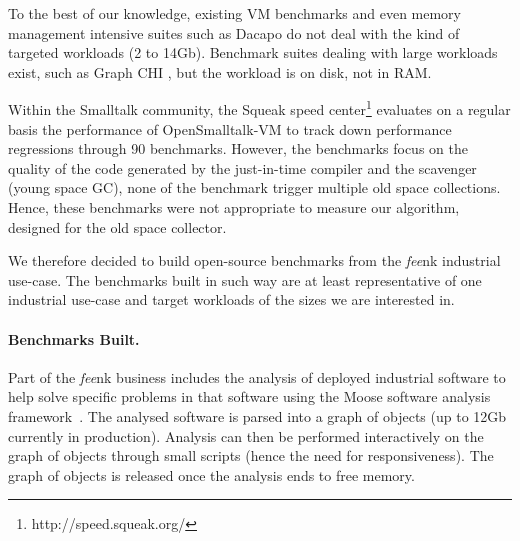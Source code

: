 \documentclass[sigplan,10pt,review,anonymous]{acmart}\settopmatter{printfolios=true,printccs=false,printacmref=false}
\def\feenk{\textit{fee}\textsf{nk}\xspace}
\def\OpenSmalltalkVM{OpenSmalltalk-VM\xspace}
\begin{document}
To the best of our knowledge, existing VM benchmarks and even memory management intensive suites such as Dacapo \cite{DacapoBench} do not deal with the kind of targeted workloads (2 to 14Gb). Benchmark suites dealing with large workloads exist, such as Graph CHI \cite{GraphCHI}, but the workload is on disk, not in RAM. 

Within the Smalltalk community, the Squeak speed center\footnote{http://speed.squeak.org/} evaluates on a regular basis the performance of \OpenSmalltalkVM to track down performance regressions through 90 benchmarks. However, the benchmarks focus on the quality of the code generated by the just-in-time compiler and the scavenger (young space GC), none of the benchmark trigger multiple old space collections. Hence, these benchmarks were not appropriate to measure our algorithm, designed for the old space collector.

We therefore decided to build open-source benchmarks from the \feenk industrial use-case. The benchmarks built in such way are at least representative of one industrial use-case and target workloads of the sizes we are interested in.



\paragraph{Benchmarks Built.} Part of the \feenk business includes the analysis of deployed industrial software to help solve specific problems in that software using the Moose software analysis framework~\cite{MooseBook1,MoosePaper1}. The analysed software is parsed into a graph of objects (up to 12Gb currently in production). Analysis can then be performed interactively on the graph of objects through small scripts (hence the need for responsiveness). The graph of objects is released once the analysis ends to free memory. 
\end{document}
